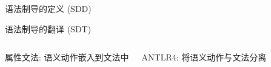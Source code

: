 
\begin{frame}{}
  \begin{center}

	\vspace{1.00cm}
	语法制导的定义 (SDD)

	\vspace{0.80cm}
	语法制导的翻译 (SDT)

	\vspace{0.80cm}
  \end{center}
\end{frame}

\begin{frame}{}
\end{frame}

\begin{frame}{}
  \begin{columns}
	  \begin{center}
		属性文法: 语义动作嵌入到文法中
	  \end{center}
	    ANTLR4: 将语义动作与文法分离
  \end{columns}
\end{frame}
